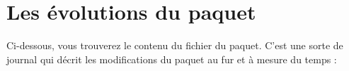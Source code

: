 \section{Les évolutions du paquet}

Ci-dessous, vous trouverez le contenu du fichier 
du paquet. C'est une sorte de journal qui décrit les modifications
du paquet au fur et à mesure du temps :

\begin{center}
\noindent\hrulefill\par

\noindent\hrulefill
\end{center}
